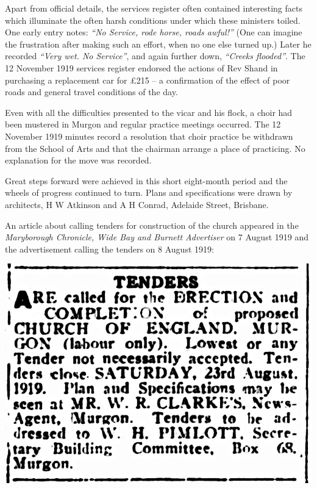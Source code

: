 Apart from official details, the services register often contained interesting facts which illuminate the often harsh conditions under which these ministers toiled. One early entry notes: \emph{``No Service, rode horse, roads awful!''} (One can imagine the frustration after making such an effort, when no one else turned up.) Later he recorded \emph{``Very wet. No Service''}, and again further down, \emph{``Creeks flooded''}. The 12 November 1919 services register endorsed the actions of Rev Shand in purchasing a replacement car for \pounds215 -- a confirmation of the effect of poor roads and general travel conditions of the day.



Even with all the difficulties presented to the vicar and his flock, a choir had been mustered in Murgon and regular practice meetings occurred. The 12 November 1919 minutes record a resolution that choir practice be withdrawn from the School of Arts and that the chairman arrange a place of practicing. No explanation for the move was recorded.



Great steps forward were achieved in this short eight-month period and the wheels of progress continued to turn. Plans and specifications were drawn by architects, H W Atkinson and A H Conrad, Adelaide Street, Brisbane.



An article about calling tenders for construction of the church appeared in the \emph{Maryborough Chronicle, Wide Bay and Burnett Advertiser} on 7 August 1919 and the advertisement calling the tenders on 8 August 1919:









\medskip
\begin{minipage}[b]{\linewidth}
\begin{center}
\includegraphics[width=1.\linewidth,center]{../images/tenderAdvertisement.png}
\end{center}
\end{minipage}
\medskip










